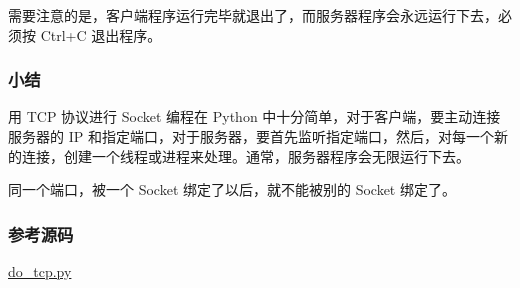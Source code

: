 需要注意的是，客户端程序运行完毕就退出了，而服务器程序会永远运行下去，必须按
Ctrl+C 退出程序。

\hypertarget{ux5c0fux7ed3}{%
\subsubsection{小结}\label{ux5c0fux7ed3}}

用 TCP 协议进行 Socket 编程在 Python
中十分简单，对于客户端，要主动连接服务器的 IP
和指定端口，对于服务器，要首先监听指定端口，然后，对每一个新的连接，创建一个线程或进程来处理。通常，服务器程序会无限运行下去。

同一个端口，被一个 Socket 绑定了以后，就不能被别的 Socket 绑定了。

\hypertarget{ux53c2ux8003ux6e90ux7801}{%
\subsubsection{参考源码}\label{ux53c2ux8003ux6e90ux7801}}

\href{https://github.com/michaelliao/learn-python3/blob/master/samples/socket/do_tcp.py}{do\_tcp.py}

